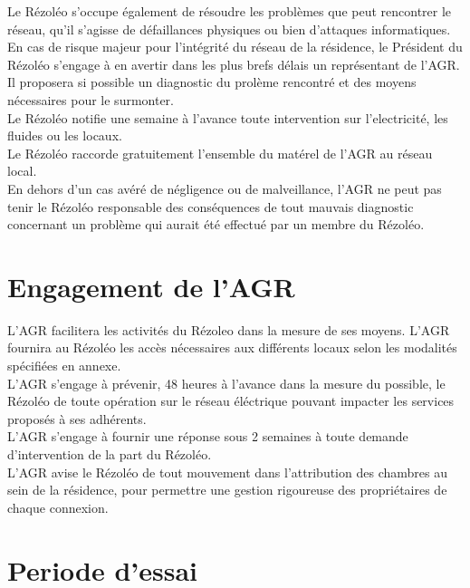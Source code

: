 \documentclass[12pt]{constitution}
\begin{document}
    Le Rézoléo s'occupe également de résoudre les problèmes que peut rencontrer le réseau, qu'il s'agisse de défaillances physiques ou bien d'attaques informatiques.\\

    En cas de risque majeur pour l'intégrité du réseau de la résidence, le Président du Rézoléo s'engage à en avertir dans les plus brefs délais un représentant de l'AGR. Il proposera si possible un diagnostic du prolème rencontré et des moyens nécessaires pour le surmonter. \\


    Le Rézoléo notifie une semaine à l'avance toute intervention sur l'electricité, les fluides ou les locaux.\\


    Le Rézoléo raccorde gratuitement l'ensemble du matérel de l'AGR au réseau local.\\


    En dehors d'un cas avéré de négligence ou de malveillance, l'AGR ne peut pas tenir le Rézoléo responsable des conséquences de tout mauvais diagnostic concernant un problème qui aurait été effectué par un membre du Rézoléo.


\section{Engagement de l'AGR}

     L'AGR facilitera les activités du Rézoleo dans la mesure de ses moyens. L'AGR fournira au Rézoléo les accès nécessaires aux différents locaux selon les modalités spécifiées en annexe.\\


    L'AGR s'engage à prévenir, 48 heures à l'avance dans la mesure du possible, le Rézoléo de toute opération sur le réseau éléctrique pouvant impacter les services proposés à ses adhérents.\\


    L'AGR s'engage à fournir une réponse sous 2 semaines à toute demande d'intervention de la part du Rézoléo.\\


    L'AGR avise le Rézoléo de tout mouvement dans l'attribution des chambres au sein de la résidence, pour permettre une gestion rigoureuse des propriétaires de chaque connexion.\\


\section{Periode d'essai}
\end{document}
